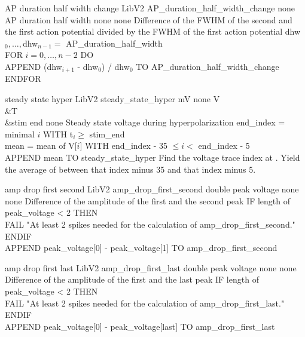 \begin{efeature}
  {AP duration half width change}
  {LibV2}
  {AP\_duration\_half\_width\_change}
  {none}
  {AP duration half width}
  {none}
  {none}
  {Difference of the FWHM of the second and the first action potential divided by the FWHM of the first action potential}
  {
  dhw$_0, \ldots, $dhw$_{n-1} =$ AP\_duration\_half\_width \\
  FOR $i = 0, \dots, n - 2$ DO \+ \\
    APPEND (dhw$_{i+1}$ - dhw$_0$) / dhw$_0$ TO AP\_duration\_half\_width\_change \- \\
  ENDFOR
  }
  
\end{efeature}

\begin{efeature}
  {steady state hyper}
  {LibV2}
  {steady\_state\_hyper}
  {mV}
  {none}
  {V\\&T\\&stim end}
  {none}
  {Steady state voltage during hyperpolarization}
  {
  end\_index = minimal $i$ WITH t$_i \ge$ stim\_end \\
  mean = mean of V[$i$] WITH end\_index - 35 $\le i <$ end\_index - 5 \\
  APPEND mean TO steady\_state\_hyper
  }
  Find the voltage trace index at .
  Yield the average of  between that index minus 35 and that index minus 5.
  
\end{efeature}

\begin{efeature}
  {amp drop first second}
  {LibV2}
  {amp\_drop\_first\_second}
  {double}
  {peak voltage}
  {none}
  {none}
  {Difference of the amplitude of the first and the second peak}
  {
  IF length of peak\_voltage < 2 THEN \+ \\
    FAIL "At least 2 spikes needed for the calculation of amp\_drop\_first\_second." \- \\
  ENDIF \\
  APPEND peak\_voltage[0] - peak\_voltage[1] TO amp\_drop\_first\_second
  }
  
\end{efeature}

\begin{efeature}
  {amp drop first last}
  {LibV2}
  {amp\_drop\_first\_last}
  {double}
  {peak voltage}
  {none}
  {none}
  {Difference of the amplitude of the first and the last peak}
  {
  IF length of peak\_voltage < 2 THEN \+ \\
    FAIL "At least 2 spikes needed for the calculation of amp\_drop\_first\_last." \- \\
  ENDIF \\
  APPEND peak\_voltage[0] - peak\_voltage[last] TO amp\_drop\_first\_last
  }
  
\end{efeature}


